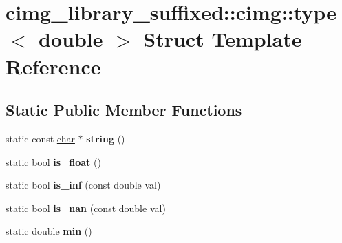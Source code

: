 \hypertarget{structcimg__library__suffixed_1_1cimg_1_1type_3_01double_01_4}{}\section{cimg\+\_\+library\+\_\+suffixed\+:\+:cimg\+:\+:type$<$ double $>$ Struct Template Reference}
\label{structcimg__library__suffixed_1_1cimg_1_1type_3_01double_01_4}
\subsection*{Static Public Member Functions}
\begin{DoxyCompactItemize}
\item 
\mbox{\label{structcimg__library__suffixed_1_1cimg_1_1type_3_01double_01_4_a6c2701e9c02888144d2a4eac61888ee0}} 
static const \hyperlink{classchar}{char} $\ast$ {\bfseries string} ()
\item 
\mbox{\label{structcimg__library__suffixed_1_1cimg_1_1type_3_01double_01_4_ae8b6116c3616ed56d9db2df5d6ae0f6d}} 
static bool {\bfseries is\+\_\+float} ()
\item 
\mbox{\label{structcimg__library__suffixed_1_1cimg_1_1type_3_01double_01_4_a92b3b5611e041d2d92073bc78cd1ca2b}} 
static bool {\bfseries is\+\_\+inf} (const double val)
\item 
\mbox{\label{structcimg__library__suffixed_1_1cimg_1_1type_3_01double_01_4_af5f51b795aafc781b014f3b00e116167}} 
static bool {\bfseries is\+\_\+nan} (const double val)
\item 
\mbox{\label{structcimg__library__suffixed_1_1cimg_1_1type_3_01double_01_4_a9897af233dde9231794f67265c727587}} 
static double {\bfseries min} ()
\item 
\mbox{\label{structcimg__library__suffixed_1_1cimg_1_1type_3_01double_01_4_a720fbcba95861e606f8b95f0ae48994e}} 

\end{DoxyCompactItemize}
